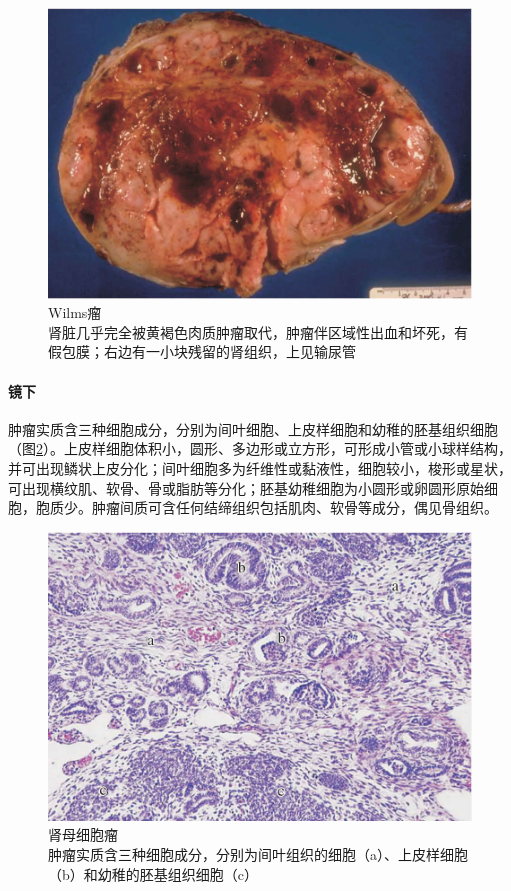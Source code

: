 \begin{figure}[!htbp]
 \centering
 \includegraphics{./images/Image00180.jpg}
 \captionsetup{justification=centering}
 \caption{Wilms瘤\\ {\small 肾脏几乎完全被黄褐色肉质肿瘤取代，肿瘤伴区域性出血和坏死，有假包膜；右边有一小块残留的肾组织，上见输尿管}}
\label{fig10-31}
  \end{figure}

\paragraph{镜下}
肿瘤实质含三种细胞成分，分别为间叶细胞、上皮样细胞和幼稚的胚基组织细胞（图\ref{fig10-32}）。上皮样细胞体积小，圆形、多边形或立方形，可形成小管或小球样结构，并可出现鳞状上皮分化；间叶细胞多为纤维性或黏液性，细胞较小，梭形或星状，可出现横纹肌、软骨、骨或脂肪等分化；胚基幼稚细胞为小圆形或卵圆形原始细胞，胞质少。肿瘤间质可含任何结缔组织包括肌肉、软骨等成分，偶见骨组织。

\begin{figure}[!htbp]
 \centering
 \includegraphics{./images/Image00181.jpg}
 \captionsetup{justification=centering}
 \caption{肾母细胞瘤\\ {\small 肿瘤实质含三种细胞成分，分别为间叶组织的细胞（a）、上皮样细胞（b）和幼稚的胚基组织细胞（c）}}
\label{fig10-32}
  \end{figure}

